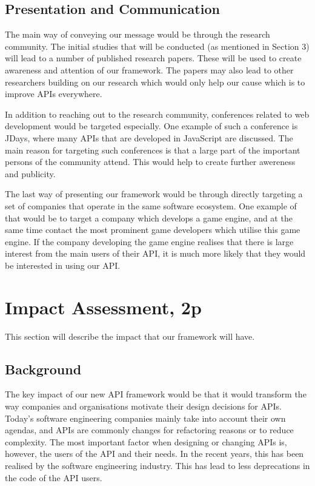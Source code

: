 \documentclass{article}
\begin{document}
\subsection{Presentation and Communication}
The main way of conveying our message would be through the research community. The initial studies that will be conducted (as mentioned in Section 3) will lead to a number of published research papers. These will be used to create awareness and attention of our framework. The papers may also lead to other researchers building on our research which would only help our cause which is to improve APIs everywhere. 

In addition to reaching out to the research community, conferences related to web development would be targeted especially. One example of such a conference is JDays, where many APIs that are developed in JavaScript are discussed. The main reason for targeting such conferences is that a large part of the important persons of the community attend. This would help to create further awereness and publicity. 

The last way of presenting our framework would be through directly targeting a set of companies that operate in the same software ecosystem. One example of that would be to target a company which develops a game engine, and at the same time contact the most prominent game developers which utilise this game engine. If the company developing the game engine realises that there is large interest from the main users of their API, it is much more likely that they would be interested in using our API. 


\section{Impact Assessment, 2p}
This section will describe the impact that our framework will have. 

\subsection{Background}
The key impact of our new API framework would be that it would transform the way companies and organisations motivate their design decisions for APIs. Today's software engineering companies mainly take into account their own agendas, and APIs are commonly changes for refactoring reasons or to reduce complexity. The most important factor when designing or changing APIs is, however, the users of the API and their needs. In the recent years, this has been realised by the software engineering industry. This has lead to less deprecations in the code of the API users. 
\end{document}
